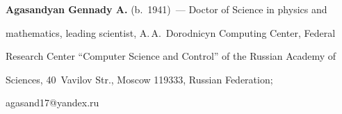   \Contrl


  


  \vspace*{-4pt}


  


  \noindent


  \textbf{Agasandyan Gennady A.} (b.\ 1941)~--- Doctor of Science in physics and 


mathematics, leading scientist, A.\,A.~Dorodnicyn Computing Center, Federal 


Research Center ``Computer Science and Control'' of the Russian Academy of 


Sciences, 40~Vavilov Str., Moscow 119333, Russian Federation; 


\mbox{agasand17@yandex.ru}


  





   


\label{end\stat}





\renewcommand{\bibname}{\protect\rm Литература} 


   


